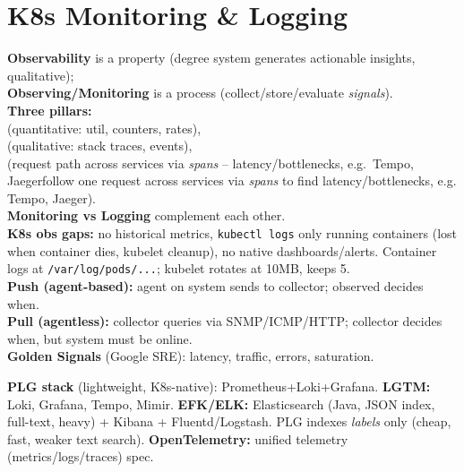 \section{K8s Monitoring \& Logging}
\textbf{Observability} is a property (degree system generates actionable insights, qualitative); \\
\textbf{Observing/Monitoring} is a process (collect/store/evaluate \textit{signals}). \\
\textbf{Three pillars:} \\
 (quantitative: util, counters, rates), \\
 (qualitative: stack traces, events), \\
 (request path across services via \textit{spans} -- latency/bottlenecks, e.g.\ Tempo, Jaegerfollow one request across services via \textit{spans} to find latency/bottlenecks, e.g. Tempo, Jaeger). \\
\textbf{Monitoring vs Logging} complement each other. \\
\textbf{K8s obs gaps:} no historical metrics, \texttt{kubectl logs} only running containers (lost when container dies, kubelet cleanup), no native dashboards/alerts. Container logs at \texttt{/var/log/pods/...}; kubelet rotates at 10MB, keeps 5. \\
\textbf{Push (agent-based):} agent on system sends to collector; observed decides when. \\
\textbf{Pull (agentless):} collector queries via SNMP/ICMP/HTTP; collector decides when, but system must be online. \\
\textbf{Golden Signals} (Google SRE): latency, traffic, errors, saturation.
\begin{mdframed}
	\textbf{PLG stack} (lightweight, K8s-native): Prometheus+Loki+Grafana. \textbf{LGTM:} Loki, Grafana, Tempo, Mimir. \textbf{EFK/ELK:} Elasticsearch (Java, JSON index, full-text, heavy) + Kibana + Fluentd/Logstash. PLG indexes \textit{labels} only (cheap, fast, weaker text search). \textbf{OpenTelemetry:} unified telemetry (metrics/logs/traces) spec.
\end{mdframed}
